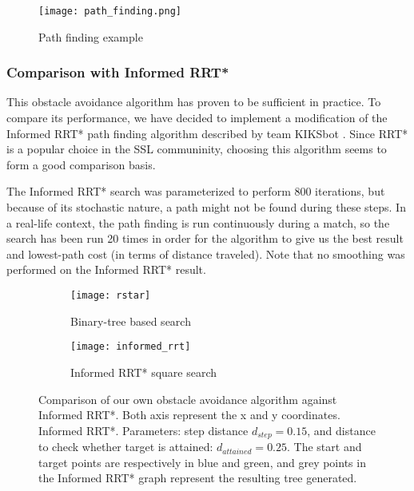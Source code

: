 \begin{figure}
    \centering
    \texttt{[image: path\_finding.png]}
    \caption{Path finding example}
    \label{fig:path_finding}
\end{figure}

\subsubsection{Comparison with Informed RRT*}
This obstacle avoidance algorithm has proven to be sufficient in practice. To compare its performance, we have decided to implement
a modification of the Informed RRT* path finding algorithm described by team KIKSbot \cite{tdp_kiksbot_2023}. Since RRT* is a popular choice in the SSL communinity,
choosing this algorithm seems to form a good comparison basis.

The Informed RRT* search was parameterized to perform 800 iterations, but because of its stochastic nature, a path might not be found
during these steps. In a real-life context, the path finding is run continuously during a match, so the search has been run 20 times
in order for the algorithm to give us the best result and lowest-path cost (in terms of distance traveled).
Note that no smoothing was performed on the Informed RRT* result.

\begin{figure}[h]
    \centering
    \begin{subfigure}[c][][c]{0.4\linewidth}
        \texttt{[image: rstar]}
        \caption{Binary-tree based search}
        \label{fig:own-obs-avoid}
    \end{subfigure}
    \hfill
    \begin{subfigure}[c][][c]{0.4\linewidth}
        \texttt{[image: informed\_rrt]}
        \caption{Informed RRT* square search}
        \label{fig:informed-rrt-star}
    \end{subfigure}
    \label{fig:avoidance}
    \caption{Comparison of our own obstacle avoidance algorithm against Informed RRT*. Both axis represent the x and y coordinates.
    Informed RRT*. Parameters: step distance $d_{step} = 0.15$, and distance to check whether target is attained: $d_{attained} = 0.25$.
    The start and target points are respectively in blue and green,
    and grey points in the Informed RRT* graph represent the resulting tree generated.}
\end{figure}

